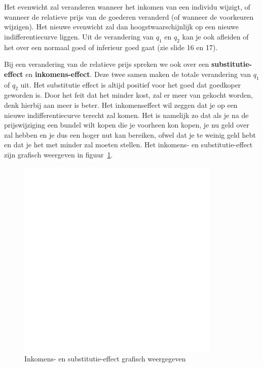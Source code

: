 Het evenwicht zal veranderen wanneer het inkomen van een individu wijzigt, of wanneer de relatieve prijs van de goederen veranderd (of wanneer de voorkeuren wijzigen). Het nieuwe evenwicht zal dan hoogstwaarschijnlijk op een nieuwe indifferentiecurve liggen. Uit de verandering van $q_1$ en $q_2$ kan je ook afleiden of het over een normaal goed of inferieur goed gaat (zie slide 16 en 17).

Bij een verandering van de relatieve prijs spreken we ook over een \textbf{substitutie-effect} en \textbf{inkomens-effect}. Deze twee samen maken de totale verandering van $q_1$ of $q_2$ uit. Het substitutie effect is altijd positief voor het goed dat goedkoper geworden is. Door het feit dat het minder kost, zal er meer van gekocht worden, denk hierbij aan meer is beter. Het inkomenseffect wil zeggen dat je op een nieuwe indifferentiecurve terecht zal komen. Het is namelijk zo dat als je na de prijswijziging een bundel wilt kopen die je voorheen kon kopen, je nu geld over zal hebben en je dus een hoger nut kan bereiken, ofwel dat je te weinig geld hebt en dat je het met minder zal moeten stellen. Het inkomens- en substitutie-effect zijn grafisch weergeven in figuur~\ref{fig:inkomensEnSubstitutieEffect}.
\begin{figure}[htbp]
	\centering
	\includegraphics[scale=0.4]{Images/white.png}
	\caption{Inkomens- en substitutie-effect grafisch weergegeven}
	\label{fig:inkomensEnSubstitutieEffect}
\end{figure}

